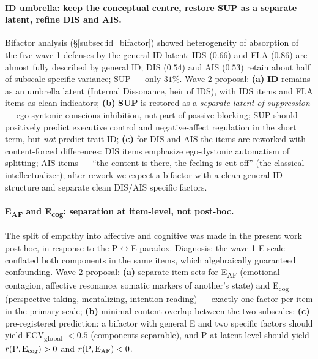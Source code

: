 \paragraph{ID umbrella: keep the conceptual centre, restore SUP as a separate latent, refine DIS and AIS.} Bifactor analysis (§\ref{subsec:id_bifactor}) showed heterogeneity of absorption of the five wave-1 defenses by the general ID latent: IDS ($0.66$) and FLA ($0.86$) are almost fully described by general ID; DIS ($0.54$) and AIS ($0.53$) retain about half of subscale-specific variance; SUP --- only $31\%$. Wave-2 proposal: \textbf{(a)} \textbf{ID} remains as an umbrella latent (Internal Dissonance, heir of IDS), with IDS items and FLA items as clean indicators; \textbf{(b)} \textbf{SUP} is restored as a \emph{separate latent of suppression} --- ego-syntonic conscious inhibition, not part of passive blocking; SUP should positively predict executive control and negative-affect regulation in the short term, but \emph{not} predict trait-ID; \textbf{(c)} for DIS and AIS the items are reworked with content-forced differences: DIS items emphasize ego-dystonic automatism of splitting; AIS items --- ``the content is there, the feeling is cut off'' (the classical intellectualizer); after rework we expect a bifactor with a clean general-ID structure and separate clean DIS/AIS specific factors.

\paragraph{E\textsubscript{AF} and E\textsubscript{cog}: separation at item-level, not post-hoc.} The split of empathy into affective and cognitive was made in the present work post-hoc, in response to the P$\leftrightarrow$E paradox. Diagnosis: the wave-1 E scale conflated both components in the same items, which algebraically guaranteed confounding. Wave-2 proposal: \textbf{(a)} separate item-sets for E\textsubscript{AF} (emotional contagion, affective resonance, somatic markers of another's state) and E\textsubscript{cog} (perspective-taking, mentalizing, intention-reading) --- exactly one factor per item in the primary scale; \textbf{(b)} minimal content overlap between the two subscales; \textbf{(c)} pre-registered prediction: a bifactor with general E and two specific factors should yield ECV\textsubscript{global} $< 0.5$ (components separable), and P at latent level should yield $r(\text{P}, \text{E\textsubscript{cog}}) > 0$ and $r(\text{P}, \text{E\textsubscript{AF}}) < 0$.


